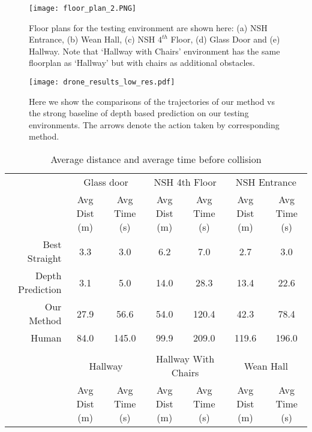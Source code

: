 \documentclass[letterpaper, 10 pt, conference]{ieeeconf}  %
\begin{document}
\begin{figure}[h!]
 \centering
 \texttt{[image: floor\_plan\_2.PNG]}
 \caption{Floor plans for the testing environment are shown here: (a) NSH Entrance, (b) Wean Hall, (c) NSH $4^{th}$ Floor, (d) Glass Door and (e) Hallway. Note that `Hallway with Chairs' environment has the same floorplan as `Hallway' but with chairs as additional obstacles.
 }
 \label{fig:floorplan}
 \end{figure}\begin{figure*}[t!]
\centering
\texttt{[image: drone\_results\_low\_res.pdf]}
\caption{Here we show the comparisons of the trajectories of our method vs the strong baseline of depth based prediction on our testing environments. The arrows denote the action taken by corresponding method. 
}
\label{fig:results}
\end{figure*}\begin{table*}[]
\centering
\caption{Average distance and average time before collision}
\label{tab:res}
\begin{tabular}{rcccccc}
\multicolumn{1}{l|}{} & \multicolumn{2}{c|}{Glass door} & \multicolumn{2}{c|}{NSH 4th Floor} & \multicolumn{2}{c}{NSH Entrance } \\ \cline{2-7} 
\multicolumn{1}{l|}{} & \multicolumn{1}{c|}{Avg Dist (m)} & \multicolumn{1}{c|}{Avg Time (s)} & \multicolumn{1}{c|}{Avg Dist (m)} & \multicolumn{1}{c|}{Avg Time (s)} & \multicolumn{1}{c|}{Avg Dist (m)} & \multicolumn{1}{c}{Avg Time (s)} \\ \hline
\multicolumn{1}{r|}{Best Straight} & 3.3 & \multicolumn{1}{c|}{3.0} & 6.2 & \multicolumn{1}{c|}{7.0} & 2.7 & 3.0 \\
\multicolumn{1}{r|}{Depth Prediction} & 3.1 & \multicolumn{1}{c|}{5.0} & 14.0 & \multicolumn{1}{c|}{28.3} & 13.4 & 22.6 \\
\multicolumn{1}{r|}{Our Method} & 27.9 & \multicolumn{1}{c|}{56.6} & 54.0 & \multicolumn{1}{c|}{120.4} & 42.3 & 78.4 \\
\multicolumn{1}{r|}{Human} & 84.0 & \multicolumn{1}{c|}{145.0} & 99.9 & \multicolumn{1}{c|}{209.0} & 119.6 & 196.0 \\
\multicolumn{1}{l}{} & \multicolumn{1}{l}{} & \multicolumn{1}{l}{} & \multicolumn{1}{l}{} & \multicolumn{1}{l}{} & \multicolumn{1}{l}{} & \multicolumn{1}{l}{} \\
\multicolumn{1}{l|}{} & \multicolumn{2}{c|}{Hallway} & \multicolumn{2}{c|}{Hallway With Chairs} & \multicolumn{2}{c}{Wean Hall} \\ \cline{2-7} 
\multicolumn{1}{l|}{} & \multicolumn{1}{c|}{Avg Dist (m)} & \multicolumn{1}{c|}{Avg Time (s)} & \multicolumn{1}{c|}{Avg Dist (m)} & \multicolumn{1}{c|}{Avg Time (s)} & \multicolumn{1}{c|}{Avg Dist (m)} & \multicolumn{1}{c}{Avg Time (s)} \\ \hline

\end{tabular}
\end{table*}
\end{document}
